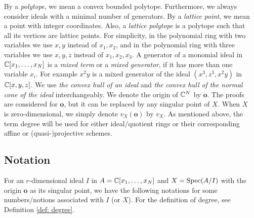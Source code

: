 \documentclass[11pt,a4paper,leqno,noamsfonts]{amsart}
\numberwithin{equation}{section}
\begin{document}
By a \textit{polytope}, we mean a convex bounded polytope. Furthermore, we always consider ideals with a minimal number of generators. By a \textit{lattice point}, we mean a point with integer coordinates. Also, a \textit{lattice polytope} is a polytope such that all its vertices are lattice points. For simplicity, in the polynomial ring with two variables we use $x,y$ instead of $x_1,x_2$, and in the polynomial ring with three variables we use $x,y,z$ instead of $x_1,x_2,x_3$. A generator of a monomial ideal in ${\mathbb{C}}[x_1,\ldots,x_N]$ is a \textit{mixed term} or a \textit{mixed generator}, if it has more than one variable $x_i$. For example $x^2y$ is a mixed generator of the ideal $(x^3,z^3,x^2y)$ in ${\mathbb{C}}[x,y,z]$. We use \emph{the convex hull of an ideal} and \emph{the convex hull of the normal cone of the ideal} interchangeably. We denote the origin of ${\mathbb{C}}^N$ by $\mathbf{o}$. The proofs are considered for $\mathbf{o}$, but it can be replaced by any singular point of $X$. When $X$ is zero-dimensional, we simply denote $v_X(\mathbf{o})$ by $v_X$. As mentioned above, the term degree will be used for either ideal/quotient rings or their corresponding affine or (quasi-)projective schemes.



\subsection*{Notation} For an $r$-dimensional ideal $I$ in $A={\mathbb{C}}[x_1,\ldots,x_N]$ and $X=\operatorname{Spec}(A/I)$ with the origin $\mathbf{o}$ as its singular point, we have the following notations for some numbers/notions associated with $I$ (or $X$). For the definition of degree, see Definition \ref{def: degree}.
\end{document}
